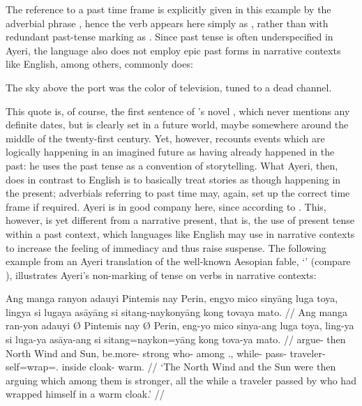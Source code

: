 The reference to a past time frame is explicitly given in this example by the 
adverbial phrase , hence the verb 
appears here simply as , rather than with redundant 
past-tense marking as . Since past tense is often 
underspecified in Ayeri, the language also does not employ epic past forms in 
narrative contexts like English, among others, commonly does: 

\ex\label{ex:neuromancer}
	The sky above the port was the color of television, tuned to a dead 
	channel. 
\xe

This quote is, of course, the first sentence of 
\citeauthor{gibson:neuromancer}'s novel , which 
never mentions any definite dates, but is clearly set in a future world, maybe 
somewhere around the middle of the twenty-first century. Yet, however, 
\citeauthor{gibson:neuromancer} recounts events which are logically happening in 
an imagined future as having already happened in the past: he uses the past 
tense as a convention of storytelling. What Ayeri, then, does in contrast to 
English is to basically treat stories as though happening in the present; 
adverbials referring to past time may, again, set up the correct time frame if 
required. Ayeri is in good company here, since according to 
\citeauthor{dahl1985} . This, however, is yet 
different from a narrative present, that is, the use of present tense 
within a past context, which languages like English may use in narrative 
contexts to increase the feeling of immediacy and thus raise suspense. The 
following example from an Ayeri translation of the well-known Aesopian fable, 
`' (compare \cite{aesop:northwind}), 
illustrates Ayeri's non-marking of tense on verbs in narrative contexts:

\ex
\begingl
	\gla Ang manga ranyon adauyi {} Pintemis nay {} Perin, engyo mico 
		sinyāng luga toya, lingya si lugaya asāyāng si sitang-naykonyāng 
		kong tovaya mato. //
	\glb Ang manga ran-yon adauyi Ø  Pintemis nay Ø Perin, eng-yo mico 
		sinya-ang luga toya, ling-ya si luga-ya asāya-ang si 
		sitang=naykon=yāng kong tova-ya mato. //
	\glc \AgtT{} \Prog{} argue-\TplN{} then \Top{} {North Wind} and 
		\Top{} Sun, be.more-\TsgN{} strong who-\Aarg{} among 
		\TplN{}.\Loc{}, while-\Loc{} \Rel{} pass-\TsgM{} 
		traveler-\Aarg{} \Rel{} self=wrap=\TsgM{}.\Aarg{} inside 
		cloak-\Loc{} warm. //
	\glft `The North Wind and the Sun were then arguing which among them is 
		stronger, all the while a traveler passed by who had wrapped 
		himself in a warm cloak.' //
\endgl
\xe

